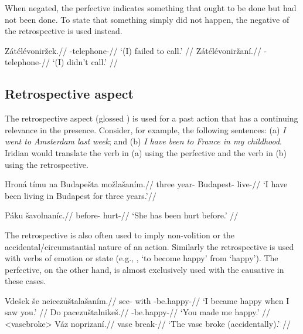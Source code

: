 When negated, the perfective indicates something that ought to be done but had not been done. To state that something simply did not happen, the negative of the retrospective is used instead.

\begin{multicols}{2}
\pex
\a\begingl
\gla Zátélévoniržek.//
\glb {}-telephone-//
\glft `(I) failed to call.' //
\endgl
\a\begingl
\gla Zátélévoniržaní.//
\glb {}-telephone-//
\glft `(I) didn't call.' //
\endgl
\xe
\end{multicols}

\subsection{Retrospective aspect}
\par The retrospective aspect (glossed ) is used for a past action that has a continuing relevance in the presence. Consider, for example, the following sentences: (a) \textit{I went to Amsterdam last week}; and (b) \textit{I have been to France in my childhood}. Iridian would translate the verb in (a) using the perfective and the verb in (b) using the retrospective.

\begingl
\gla Hroná tímu na Budapešta možlašaním.//
\glb three year-  Budapest- live-//
\glft `I have been living in Budapest for three years.'//
\endgl
\xe

\begingl
\gla Páku šavolnaníc.//
\glb before- hurt-//
\glft `She has been hurt before.' //
\endgl
\xe

\par The retrospective is also often used to imply non-volition or the  accidental/circumstantial nature of an action. Similarly the retrospective is used with verbs of emotion or state (e.g., , ‘to become happy’ from  ‘happy’). The perfective, on the other hand, is almost exclusively used with the causative in these cases.

\pex
\a	\begingl
\gla Vdešek še neicezuštalašaním.//
\glb see- with -be.happy-//
\glft `I became happy when I saw you.' //
\endgl
\a	\begingl
\gla Do pacezuštalnikeš.//
\glb {} -be.happy-//
\glft `You made me happy.' //
\endgl
\xe
\pex<vasebroke>
\begingl
\gla Váz noprizaní.//
\glb vase break-//
\glft `The vase broke (accidentally).' //
\endgl
\xe

